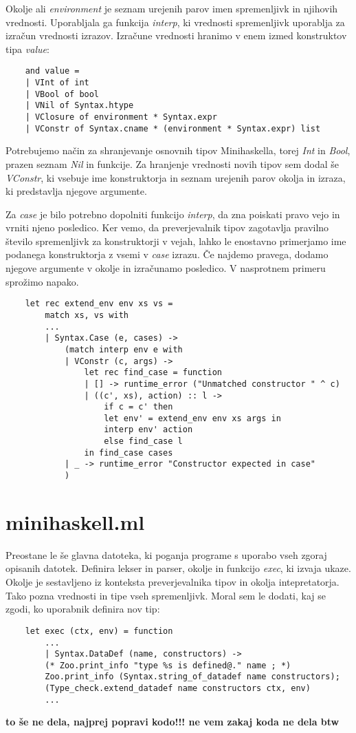 \documentclass[12pt,a4paper,openany]{book}
\begin{document}
Okolje ali \emph{environment} je seznam urejenih parov imen spremenljivk in njihovih vrednosti. Uporabljala ga funkcija \emph{interp}, ki vrednosti spremenljivk uporablja za izračun 
vrednosti izrazov. Izračune vrednosti hranimo v enem izmed konstruktov tipa \emph{value}: 
\begin{lstlisting}
	and value =
	| VInt of int
	| VBool of bool
	| VNil of Syntax.htype
	| VClosure of environment * Syntax.expr
	| VConstr of Syntax.cname * (environment * Syntax.expr) list
\end{lstlisting}
Potrebujemo način za shranjevanje osnovnih tipov Minihaskella, torej \emph{Int} in \emph{Bool}, prazen seznam \emph{Nil} in funkcije. Za hranjenje vrednosti novih tipov sem dodal še 
\emph{VConstr}, ki vsebuje ime konstruktorja in seznam urejenih parov okolja in izraza, ki predstavlja njegove argumente. 

Za \emph{case} je bilo potrebno dopolniti funkcijo \emph{interp}, da zna poiskati pravo vejo in vrniti njeno posledico. Ker vemo, da preverjevalnik tipov zagotavlja pravilno število 
spremenljivk za konstruktorji v vejah, lahko le enostavno primerjamo ime podanega konstruktorja z vsemi v \emph{case} izrazu. Če najdemo pravega, dodamo njegove argumente v okolje in 
izračunamo posledico. V nasprotnem primeru sprožimo napako. 
\begin{lstlisting}
	let rec extend_env env xs vs =
  		match xs, vs with
		...
		| Syntax.Case (e, cases) ->
			(match interp env e with
			| VConstr (c, args) ->
				let rec find_case = function
				| [] -> runtime_error ("Unmatched constructor " ^ c)
				| ((c', xs), action) :: l ->
					if c = c' then
					let env' = extend_env env xs args in
					interp env' action
					else find_case l
				in find_case cases
			| _ -> runtime_error "Constructor expected in case"
			)
\end{lstlisting}

\section{minihaskell.ml}
Preostane le še glavna datoteka, ki poganja programe s uporabo vseh zgoraj opisanih datotek. Definira lekser in parser, okolje in funkcijo \emph{exec}, ki izvaja ukaze. Okolje je sestavljeno 
iz konteksta preverjevalnika tipov in okolja intepretatorja. Tako pozna vrednosti in tipe vseh spremenljivk. Moral sem le dodati, kaj se zgodi, ko uporabnik definira nov tip:
\begin{lstlisting}
	let exec (ctx, env) = function
		...
		| Syntax.DataDef (name, constructors) ->
        (* Zoo.print_info "type %s is defined@." name ; *)
        Zoo.print_info (Syntax.string_of_datadef name constructors);
        (Type_check.extend_datadef name constructors ctx, env)
		...
\end{lstlisting}
\textbf{to še ne dela, najprej popravi kodo!!! ne vem zakaj koda ne dela btw}
\end{document}

